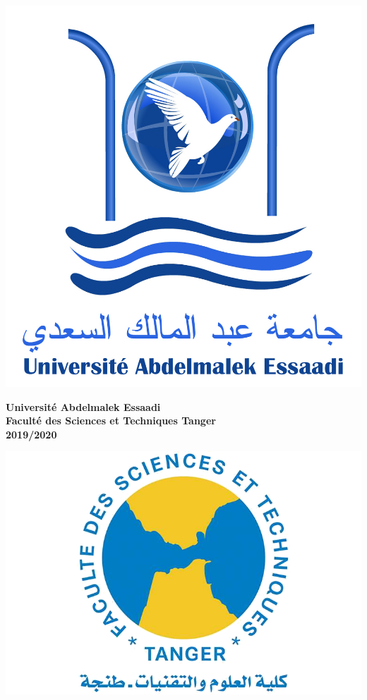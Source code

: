 \begin{titlepage}

\noindent
\begin{minipage}{0.15\textwidth}
      \includegraphics[width=\linewidth]{resources/uae.jpg}
\end{minipage}
\hfill
\begin{minipage}{0.5\textwidth}
  \begin{center}
    \textbf{\large Université Abdelmalek Essaadi}\\[0.3cm] %
    \textbf{\large Faculté des Sciences et Techniques Tanger}\\[0.5cm] %
    \textbf{\large 2019/2020}\\[1.5cm]
  \end{center}
    
\end{minipage}
\hfill
\begin{minipage}{0.2\textwidth}
  \includegraphics[width=\linewidth]{resources/fstt.png}
\end{minipage}


\end{titlepage}
